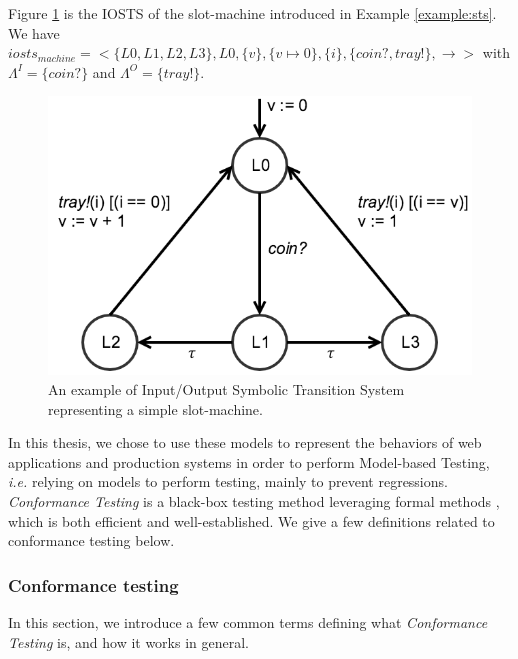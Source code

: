 \begin{example}
    Figure \ref{fig:iosts-example} is the IOSTS of the
    slot-machine introduced in Example \vref{example:sts}.  We
    have $iosts_{machine} = <\{L0, L1, L2, L3\}, L0, \{ v \}, \{
    v \mapsto 0 \}, \{ i \}, \{ coin?, tray! \}, \rightarrow >$
    with $\Lambda^I = \{ coin? \}$ and $\Lambda^O = \{ tray! \}$.

    \begin{figure}[ht]
        \begin{center}
            \includegraphics[width=0.7\linewidth]{figures/iosts-example.png}
        \end{center}

        \caption{An example of Input/Output Symbolic Transition
        System representing a simple slot-machine.}
        \label{fig:iosts-example}
    \end{figure}
\end{example}

In this thesis, we chose to use these models to represent the
behaviors of web applications and production systems in order to
perform Model-based Testing, \emph{i.e.} relying on models to
perform testing, mainly to prevent regressions. \emph{Conformance
Testing} is a black-box testing method leveraging formal methods
\cite{tretmans1992formal}, which is both efficient and
well-established. We give a few definitions related to
conformance testing below.

\subsubsection{Conformance testing}

In this section, we introduce a few common terms defining what
\emph{Conformance Testing}
\cite{brinksma1989formal,tretmans1992formal,Tretmans:1993:FAC:648128.747730}
is, and how it works in general.

